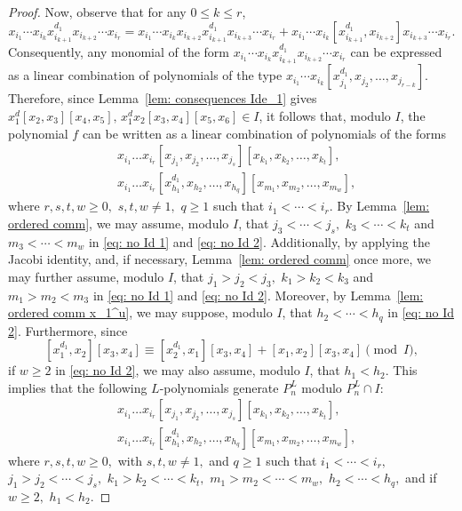 \documentclass[a4paper,reqno]{amsart}
\theoremstyle{definition}
\numberwithin{equation}{section}
\numberwithin{theorem}{section}
\begin{document}
\begin{proof}
     Now, observe that for any $0\leq k \leq r$, 
     $$
      x_{i_1}\cdots x_{i_k}x_{i_{k+1}}^{d_1}x_{i_{k+2}}\cdots x_{i_r}=  x_{i_1}\cdots x_{i_k}x_{i_{k+2}}x_{i_{k+1}}^{d_1}x_{i_{k+3}}\cdots x_{i_r}+  x_{i_1}\cdots x_{i_k}[x_{i_{k+1}}^{d_1},x_{i_{k+2}}]x_{i_{k+3}}\cdots x_{i_r}.
     $$
     Consequently, any monomial of the form $ x_{i_1}\cdots x_{i_k}x_{i_{k+1}}^{d_1}x_{i_{k+2}}\cdots x_{i_r}$ can be expressed as a linear combination of polynomials of the type
     $ x_{i_1}\cdots x_{i_k}[x_{j_1}^{d_1},x_{j_2},\ldots, x_{j_{r-k}}]
     $. 
     Therefore, since Lemma~\ref{lem: consequences Ide_1} gives $x_1^{d}[x_2,x_3][x_4,x_5], \, x_1^{d}x_2[x_3,x_4][x_5,x_6]\in I$, it follows that, modulo $I$, the polynomial $f$ can be written as a linear combination of polynomials of the forms
     \begin{align}
&x_{i_{1}}\dots x_{i_{r}}[x_{j_1},x_{j_2},\dots,x_{j_s}][x_{k_1},x_{k_2},\dots,x_{k_t}],\label{eq: no Id 1}\\
&x_{i_{1}}\dots x_{i_{r}}[x_{h_1}^{d_1},x_{h_2},\dots,x_{h_q}][x_{m_1},x_{m_2},\dots,x_{m_w}], \label{eq: no Id 2}
\end{align}
where $r,s,t,w \geq 0,$ $s,t,w\neq 1,$ $q\geq 1$ such that $i_1< \cdots < i_r.$ 
By Lemma~\ref{lem: ordered comm}, we may assume, modulo $I$, that $j_3<  \cdots < j_s,$ $k_3<  \cdots < k_t$ and $m_3<  \cdots < m_w$ in \eqref{eq: no Id 1} and \eqref{eq: no Id 2}. 
Additionally, by applying the Jacobi identity, and, if necessary, Lemma~\ref{lem: ordered comm} once more, we may further assume, modulo $I$, that $j_1>j_2< j_3,$  $k_1>k_2< k_3$ and $m_1>m_2< m_3$ in \eqref{eq: no Id 1} and \eqref{eq: no Id 2}. Moreover, by Lemma~\ref{lem: ordered comm x_1^u}, we may suppose, modulo $I$, that $h_2< \cdots <h_q$ in \eqref{eq: no Id 2}.
Furthermore, since 
$$[x_1^{d_1},x_2][x_3,x_4]\equiv [x_2^{d_1},x_1][x_3,x_4] + [x_1,x_2][x_3,x_4] \pmod{I},$$ 
if $w\geq 2$ in \eqref{eq: no Id 2}, we may also assume, modulo $I$, that $h_1<h_2.$   
This implies that the following $L$-polynomials generate $P_{n}^L$ modulo $P_{n}^L\cap I$:
\begin{equation}\label{P_n^L modulo Id UT_3^e1}
\begin{split}
    &x_{i_{1}}\dots x_{i_{r}}[x_{j_1},x_{j_2},\dots,x_{j_s}][x_{k_1},x_{k_2},\dots,x_{k_t}],\\
&x_{i_{1}}\dots x_{i_{r}}[x_{h_1}^{d_1},x_{h_2},\dots,x_{h_q}][x_{m_1},x_{m_2},\dots,x_{m_w}],
\end{split}
\end{equation}
where $r,s,t,w \geq 0,$ with $s,t,w\neq 1,$ and $q\geq 1$ such that $i_1< \cdots < i_r,$ $j_1>j_2<  \cdots < j_s,$ $k_1>k_2<  \cdots < k_t,$ $m_1>m_2<  \cdots < m_w,$ $h_2< \cdots <h_q,$ and if $w\geq 2,$ $h_1< h_2.$





\end{proof}
\end{document}
